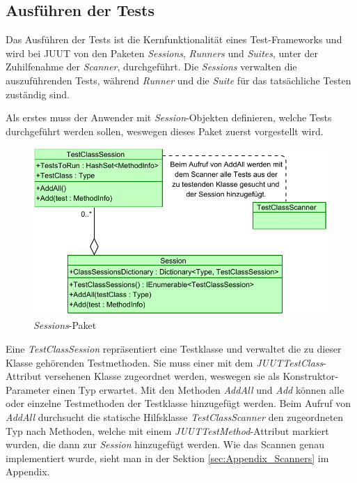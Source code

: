 \subsection{Ausführen der Tests}

Das Ausführen der Tests ist die Kernfunktionalität eines Test-Frameworks und wird bei JUUT von den Paketen \textit{Sessions}, \textit{Runners} und \textit{Suites}, unter der Zuhilfenahme der \textit{Scanner}, durchgeführt. Die \textit{Sessions} verwalten die auszuführenden Tests, während \textit{Runner} und die \textit{Suite} für das tatsächliche Testen zuständig sind.

Als erstes muss der Anwender mit \textit{Session}-Objekten definieren, welche Tests durchgeführt werden sollen, weswegen dieses Paket zuerst vorgestellt wird.

\begin{figure}[h]
\centering
\includegraphics[width=0.8\linewidth]{images/Kapitel_Ergebnis/Sessions}
\caption[\textit{Sessions}-Paket]{\textit{Sessions}-Paket}
\label{fig:Sessions}
\end{figure}

Eine \textit{TestClassSession} repräsentiert eine Testklasse und verwaltet die zu dieser Klasse gehörenden Testmethoden. Sie muss einer mit dem \textit{JUUTTestClass}-Attribut versehenen Klasse zugeordnet werden, weswegen sie als Konstruktor-Parameter einen Typ erwartet. Mit den Methoden \textit{AddAll} und \textit{Add} können alle oder einzelne Testmethoden der Testklasse hinzugefügt werden. Beim Aufruf von \textit{AddAll} durchsucht die statische Hilfsklasse \textit{TestClassScanner} den zugeordneten Typ nach Methoden, welche mit einem \textit{JUUTTestMethod}-Attribut markiert wurden, die dann zur \textit{Session} hinzugefügt werden. Wie das Scannen genau implementiert wurde, sieht man in der Sektion \ref{sec:Appendix_Scanners}  im Appendix.

